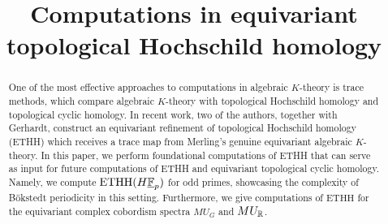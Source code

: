 \documentclass[11pt,dvipsnames]{amsart}
\title{Computations in equivariant topological Hochschild homology}
\date{}
\begin{document}
\begin{abstract}
    One of the most effective approaches to computations in algebraic $K$-theory is trace methods, which compare algebraic $K$-theory with topological Hochschild homology and topological cyclic homology. In recent work, two of the authors, together with Gerhardt, construct an equivariant refinement of topological Hochschild homology (ETHH) which receives a trace map from Merling's genuine equivariant algebraic $K$-theory. In this paper, we perform foundational computations of ETHH that can serve as input for future computations of ETHH and equivariant topological cyclic homology.  Namely, we compute $\mathrm{ETHH}(H\underline{\mathbb{F}}_p)$ for odd primes, showcasing the complexity of B\"okstedt periodicity in this setting.  Furthermore, we give computations of $\mathrm{ETHH}$ for the equivariant complex cobordism spectra $MU_G$ and $MU_{\mathbb{R}}$.
\end{abstract}
\maketitle
\tableofcontents




%



\end{document}
